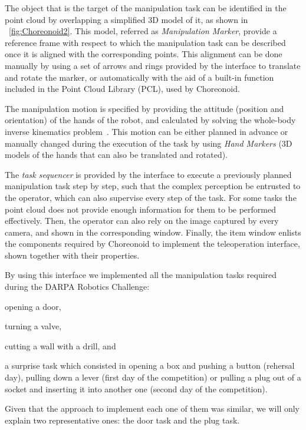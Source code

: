 	The object that is the target of the manipulation task can be identified in the point cloud
	by overlapping a simplified 3D model of it, as shown in \figurename~\ref{fig:Choreonoid2}.
	This model, referred as \emph{Manipulation Marker}, provide a reference frame with respect
	to which the manipulation task can be described once it is aligned with the corresponding
	points.
	This alignment can be done manually by using a set of arrows and rings provided by the interface
	to translate and rotate the marker, or automatically with the aid of a built-in function included
	in the Point Cloud Library (PCL), used by Choreonoid.
	
	The manipulation motion is specified by providing the attitude (position and orientation)
	of the hands of the robot, and calculated by solving the whole-body inverse kinematics
	problem~\cite{Kanoun}.
	This motion can be either planned in advance or manually changed during the execution of the task
	by using \emph{Hand Markers} (3D models of the hands that can also be translated and rotated).
	
	The \emph{task sequencer} is provided by the interface to execute a previously planned manipulation
	task step by step, such that the complex perception be entrusted to the operator, which	can also
	supervise every step of the task.
	For some tasks the point cloud does not provide enough information for them to be performed effectively.
	Then, the operator can also rely on the image captured by every camera,
	and shown in the corresponding window.
	Finally, the item window enlists the components required by Choreonoid to implement the teleoperation
	interface, shown together with their properties.
	
	By using this interface we implemented all the manipulation tasks required during the
	DARPA Robotics Challenge:
	\begin{inparaenum}[(1)]
		\item opening a door,
		\item turning a valve,
		\item cutting a wall with a drill, and
		\item a surprise task which consisted in opening a box and pushing a button (rehersal day),
					pulling down a lever (first day of the competition) or
					pulling a plug out of a socket and inserting it into another one (second day of the competition).
	\end{inparaenum}
	Given that the approach to implement each one of them was similar,
	we will only explain two representative ones:
	the door task and the plug task.